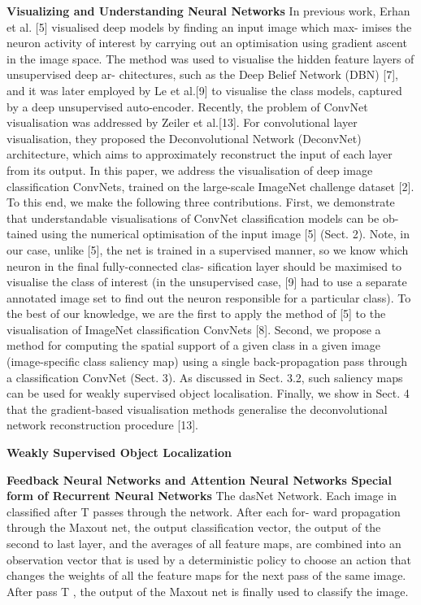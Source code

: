 \textbf{Visualizing and Understanding Neural Networks}
In previous work, Erhan et al. [5] visualised deep models by finding an input image which max- imises the neuron activity of interest by carrying out an optimisation using gradient ascent in the image space. The method was used to visualise the hidden feature layers of unsupervised deep ar- chitectures, such as the Deep Belief Network (DBN) [7], and it was later employed by Le et al.[9] to visualise the class models, captured by a deep unsupervised auto-encoder. Recently, the problem of ConvNet visualisation was addressed by Zeiler et al.[13]. For convolutional layer visualisation, they proposed the Deconvolutional Network (DeconvNet) architecture, which aims to approximately reconstruct the input of each layer from its output. 
In this paper, we address the visualisation of deep image classification ConvNets, trained on the large-scale ImageNet challenge dataset [2]. To this end, we make the following three contributions. First, we demonstrate that understandable visualisations of ConvNet classification models can be ob- tained using the numerical optimisation of the input image [5] (Sect. 2). Note, in our case, unlike [5], the net is trained in a supervised manner, so we know which neuron in the final fully-connected clas- sification layer should be maximised to visualise the class of interest (in the unsupervised case, [9] had to use a separate annotated image set to find out the neuron responsible for a particular class). To the best of our knowledge, we are the first to apply the method of [5] to the visualisation of ImageNet classification ConvNets [8]. Second, we propose a method for computing the spatial support of a given class in a given image (image-specific class saliency map) using a single back-propagation pass through a classification ConvNet (Sect. 3). As discussed in Sect. 3.2, such saliency maps can be used for weakly supervised object localisation. Finally, we show in Sect. 4 that the gradient-based visualisation methods generalise the deconvolutional network reconstruction procedure [13]. 

\textbf{Weakly Supervised Object Localization}

\textbf{Feedback Neural Networks and Attention Neural Networks  Special form of Recurrent Neural Networks} 
The dasNet Network. Each image in classified after T passes through the network. After each for- ward propagation through the Maxout net, the output classification vector, the output of the second to last layer, and the averages of all feature maps, are combined into an observation vector that is used by a deterministic policy to choose an action that changes the weights of all the feature maps for the next pass of the same image. After pass T , the output of the Maxout net is finally used to classify the image. 
